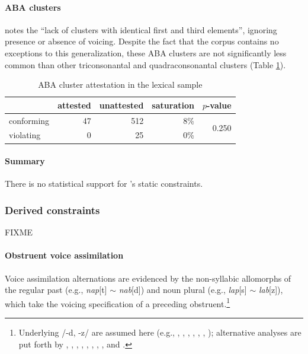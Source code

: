 \paragraph{ABA clusters} \citet[][176]{Pierrehumbert1994} notes the ``lack of clusters with identical first and third elements'', ignoring presence or absence of voicing. Despite the fact that the corpus contains no exceptions to this generalization, these \textsc{ABA} clusters are not significantly less common than other triconsonantal and quadraconsonantal clusters (Table \ref{abatab}).

\begin{table}
\centering
\begin{tabular}{l rrrr}
\toprule
           & attested & unattested & saturation & $p$-value \\
\midrule
conforming & 47       & 512        &  8\%       & \multirow{2}{*}{0.250} \\
violating  &  0       &  25        &  0\%       \\
\bottomrule
\end{tabular}
\caption{ABA cluster attestation in the lexical sample}
\label{abatab}
\end{table}

\paragraph{Summary} There is no statistical support for \citeauthor{Pierrehumbert1994}'s static constraints.

\subsubsection{Derived constraints}

FIXME

\paragraph{Obstruent voice assimilation}
\label{ova}

Voice assimilation alternations are evidenced by the non-syllabic allomorphs of the regular past (e.g., \emph{nap}[t] $\sim$ \emph{nab}[d]) and noun plural (e.g., \emph{lap}[s] $\sim$ \emph{lab}[z]), which take the voicing specification of a preceding obstruent.\footnote{Underlying /-d, -z/ are assumed here (e.g., \citealt{Anderson1973a}, \citealt[284f.]{Bakovic2005b}, \citealt{Basboll1972}, \citealt[210]{SPE}, \citealt[282]{Hockett1958}, \citealt[102]{Pinker1988}, \citealt{Shibatani1972}); alternative analyses are put forth by \citet[210f.]{LANGUAGE}, \citet[135]{Borowsky1986}, \citet{Hoard1971}, \citet{Kiparsky1985}, \citet{Lightner1970}, \citet{Luelsdorff1969}, \citet{Miner1975}, \citet[426]{Nida1948}, and \citet{Zwicky1975}.}

